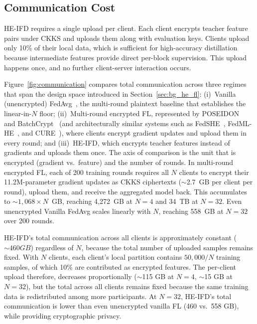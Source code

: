 
\subsection{Communication Cost}
\label{sec:comm_comp}

HE-IFD requires a single upload per client. Each client encrypts teacher feature pairs under CKKS and uploads them along with evaluation keys. Clients upload only 10\% of their local data, which is sufficient for high-accuracy distillation because intermediate features provide direct per-block supervision. This upload happens once, and no further client-server interaction occurs.

Figure~\ref{fig:communication} compares total communication across three regimes that span the design space introduced in Section~\ref{sec:bg_he_fl}: (i)~Vanilla (unencrypted) FedAvg~\cite{mcmahan2017communication}, the multi-round plaintext baseline that establishes the linear-in-$N$ floor; (ii)~Multi-round encrypted FL, represented by POSEIDON~\cite{sav2021poseidon} and BatchCrypt~\cite{zhang2020batchcrypt} (and architecturally similar systems such as FedSHE~\cite{wei2025fedshe}, FedML-HE~\cite{jin2023fedml}, and CURE~\cite{kanpak2024cure}), where clients encrypt gradient updates and upload them in every round; and (iii)~HE-IFD, which encrypts teacher features instead of gradients and uploads them once. The axis of comparison is the unit that is encrypted (gradient vs.\ feature) and the number of rounds. In multi-round encrypted FL, each of 200 training rounds requires all $N$ clients to encrypt their 11.2M-parameter gradient updates as CKKS ciphertexts (${\sim}$2.7~GB per client per round), upload them, and receive the aggregated model back. This accumulates to ${\sim}1{,}068 \times N$~GB, reaching 4,272~GB at $N{=}4$ and 34~TB at $N{=}32$. Even unencrypted Vanilla FedAvg scales linearly with $N$, reaching 558~GB at $N{=}32$ over 200 rounds.

HE-IFD's total communication across all clients is approximately constant ($\sim460 GB$) regardless of $N$, because the total number of uploaded samples remains fixed. With $N$ clients, each client's local partition contains $50{,}000/N$ training samples, of which 10\% are contributed as encrypted features. The per-client upload therefore, decreases proportionally (${\sim}$115 GB at $N{=}4$, ${\sim}$15 GB at $N{=}32$), but the total across all clients remains fixed because the same training data is redistributed among more participants. At $N{=}32$, HE-IFD's total communication is lower than even unencrypted vanilla FL (460 vs.\ 558 GB), while providing cryptographic privacy.

